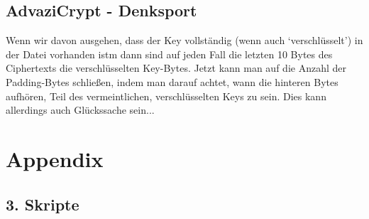 \documentclass[10pt,a4paper]{article}
\begin{document}
\subsection{AdvaziCrypt - Denksport}
Wenn wir davon ausgehen, dass der Key vollständig (wenn auch `verschlüsselt') in der Datei vorhanden istm
dann sind auf jeden Fall die letzten 10 Bytes des Ciphertexts die verschlüsselten Key-Bytes. Jetzt kann man
auf die Anzahl der Padding-Bytes schließen, indem man darauf achtet, wann die hinteren Bytes aufhören, Teil
des vermeintlichen, verschlüsselten Keys zu sein.
Dies kann allerdings auch Glückssache sein...

\newpage
\section*{Appendix}
\subsection{3. Skripte}
\inputminted{python}{crack_bazi.py}
\end{document}
